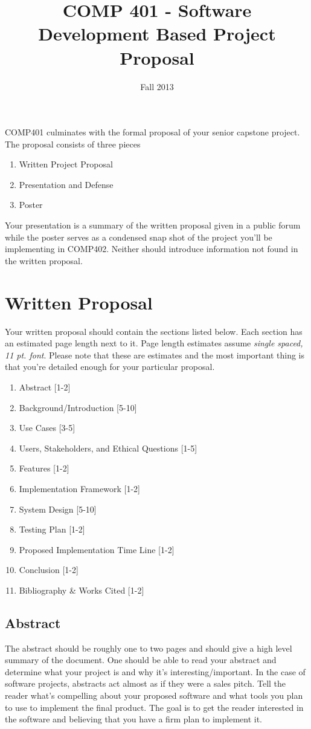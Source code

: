 \documentclass[10pt]{article}
\title{COMP 401 - Software Development Based Project Proposal}
\author{  }
\date{Fall 2013}
\begin{document}
\maketitle

COMP401 culminates with the formal proposal of your senior capstone project.  The proposal consists of three pieces
\begin{enumerate}
\item Written Project Proposal
\item Presentation and Defense 
\item Poster
\end{enumerate}
Your presentation is a summary of the written proposal given in a public forum while the poster serves as a condensed snap shot of the project you'll be implementing in COMP402.  Neither should introduce information not found in the written proposal.

\section{Written Proposal}

Your written proposal should contain the sections listed below.  Each section has an estimated page length next to it.  Page length estimates assume \textit{single spaced, 11 pt. font}.  Please note that these are estimates and the most important thing is that you're detailed enough for your particular proposal.   
\begin{enumerate}
\item Abstract [1-2]
\item Background/Introduction [5-10]
\item Use Cases [3-5]
\item Users, Stakeholders, and Ethical Questions [1-5]
\item Features [1-2]
\item Implementation Framework [1-2]
\item System Design [5-10]
\item Testing Plan [1-2]
\item Proposed Implementation Time Line [1-2]
\item Conclusion [1-2]
\item Bibliography \& Works Cited [1-2]
\end{enumerate}

\subsection{Abstract}
The abstract should be roughly one to two pages and should give a high level summary of the document.  One should be able to read your abstract and determine what your project is and why it's interesting/important.  In the case of software projects, abstracts act almost as if they were a sales pitch.  Tell the reader what's compelling about your proposed software and what tools you plan to use to implement the final product.  The goal is to get the reader interested in the software and believing that you have a firm plan to implement it.  
\end{document}
